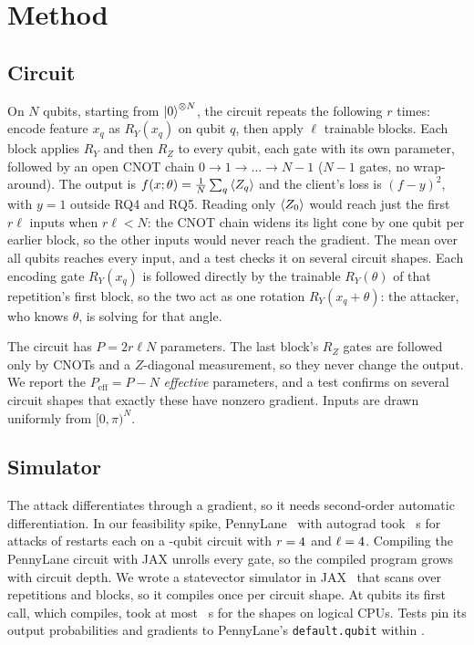 \documentclass[10pt,conference]{IEEEtran}
\begin{document}
\section{Method}
\subsection{Circuit}
On $N$ qubits, starting from $\ket{0}^{\otimes N}$, the circuit repeats the following $r$ times: encode feature $x_q$ as $R_Y(x_q)$ on
qubit $q$, then apply $\ell$ trainable blocks. Each block applies $R_Y$ and then $R_Z$ to every
qubit, each gate with its own parameter, followed by an open CNOT chain $0\to1\to\dots\to N-1$ ($N-1$ gates, no wrap-around). The output is
$f(x;\theta) = \tfrac1N\sum_q\braket{Z_q}$ and the client's loss is $(f - y)^2$, with $y = 1$
outside RQ4 and RQ5. Reading only $\braket{Z_0}$ would reach just the first $r\ell$ inputs when
$r\ell < N$: the CNOT chain widens its light cone by one qubit per earlier block, so the other
inputs would never reach the gradient. The mean
over all qubits reaches every input, and a test checks it on several circuit shapes. Each encoding
gate $R_Y(x_q)$ is followed directly by the trainable $R_Y(\theta)$ of that repetition's first block, so the two act
as one rotation $R_Y(x_q + \theta)$: the attacker, who knows $\theta$, is solving for that angle.

The circuit has $P = 2r\ell N$ parameters. The last block's $R_Z$ gates are followed only by CNOTs and
a $Z$-diagonal measurement, so they never change the output. We report the
$P_{\mathrm{eff}} = P - N$ \emph{effective} parameters, and a test confirms on several circuit
shapes that exactly these have nonzero gradient. Inputs are drawn uniformly from $[0,\pi)^N$.

\subsection{Simulator}
The attack differentiates through a gradient, so it needs second-order automatic differentiation.
In our feasibility spike, PennyLane~\cite{bergholm2018} with autograd took \SpikeSeconds~s for
\SpikeSeeds{} attacks of \SpikeRestarts{} restarts each on a \SpikeQubits-qubit circuit with
$r = 4$ and $\ell = 4$. Compiling the PennyLane circuit with JAX unrolls every
gate, so the compiled program grows with circuit depth. We wrote a statevector simulator in
JAX~\cite{jax2018} that scans over repetitions and blocks, so it compiles once per circuit shape.
At \CompileQubits{} qubits its first call, which compiles, took at most \CompileMaxSeconds~s for
the \CompileShapes{} shapes on \CompileCpus{} logical CPUs. Tests pin its output probabilities and
gradients to PennyLane's \texttt{default.qubit} within \ReferenceTol.
\end{document}

